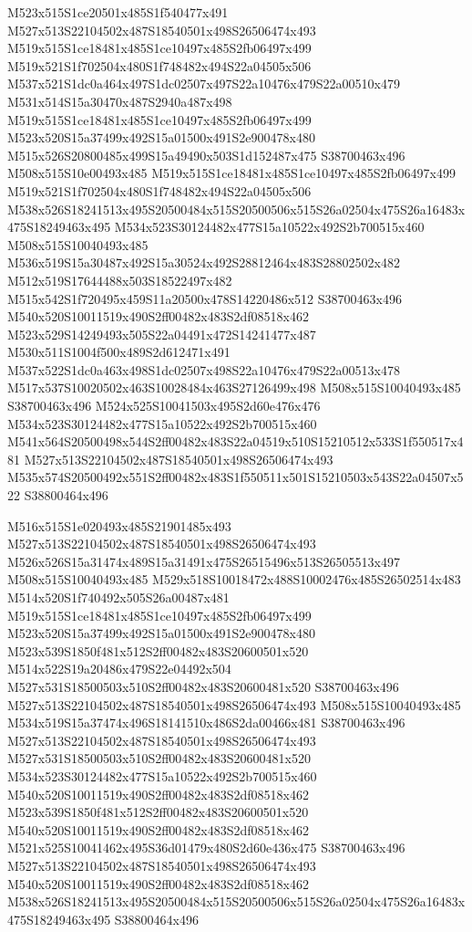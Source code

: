 \documentclass{article}
\begin{document}
\begin{multicols}{2}
M523x515S1ce20501x485S1f540477x491 M527x513S22104502x487S18540501x498S26506474x493 M519x515S1ce18481x485S1ce10497x485S2fb06497x499 M519x521S1f702504x480S1f748482x494S22a04505x506 M537x521S1dc0a464x497S1dc02507x497S22a10476x479S22a00510x479 M531x514S15a30470x487S2940a487x498 M519x515S1ce18481x485S1ce10497x485S2fb06497x499 M523x520S15a37499x492S15a01500x491S2e900478x480 M515x526S20800485x499S15a49490x503S1d152487x475 S38700463x496 M508x515S10e00493x485 M519x515S1ce18481x485S1ce10497x485S2fb06497x499 M519x521S1f702504x480S1f748482x494S22a04505x506 M538x526S18241513x495S20500484x515S20500506x515S26a02504x475S26a16483x475S18249463x495 M534x523S30124482x477S15a10522x492S2b700515x460 M508x515S10040493x485 M536x519S15a30487x492S15a30524x492S28812464x483S28802502x482 M512x519S17644488x503S18522497x482 M515x542S1f720495x459S11a20500x478S14220486x512 S38700463x496 M540x520S10011519x490S2ff00482x483S2df08518x462 M523x529S14249493x505S22a04491x472S14241477x487 M530x511S1004f500x489S2d612471x491 M537x522S1dc0a463x498S1dc02507x498S22a10476x479S22a00513x478 M517x537S10020502x463S10028484x463S27126499x498 M508x515S10040493x485 S38700463x496 M524x525S10041503x495S2d60e476x476 M534x523S30124482x477S15a10522x492S2b700515x460 M541x564S20500498x544S2ff00482x483S22a04519x510S15210512x533S1f550517x481 M527x513S22104502x487S18540501x498S26506474x493 M535x574S20500492x551S2ff00482x483S1f550511x501S15210503x543S22a04507x522 S38800464x496


M516x515S1e020493x485S21901485x493 M527x513S22104502x487S18540501x498S26506474x493 M526x526S15a31474x489S15a31491x475S26515496x513S26505513x497 M508x515S10040493x485 M529x518S10018472x488S10002476x485S26502514x483 M514x520S1f740492x505S26a00487x481 M519x515S1ce18481x485S1ce10497x485S2fb06497x499 M523x520S15a37499x492S15a01500x491S2e900478x480 M523x539S1850f481x512S2ff00482x483S20600501x520 M514x522S19a20486x479S22e04492x504 M527x531S18500503x510S2ff00482x483S20600481x520 S38700463x496 M527x513S22104502x487S18540501x498S26506474x493 M508x515S10040493x485 M534x519S15a37474x496S18141510x486S2da00466x481 S38700463x496 M527x513S22104502x487S18540501x498S26506474x493 M527x531S18500503x510S2ff00482x483S20600481x520 M534x523S30124482x477S15a10522x492S2b700515x460 M540x520S10011519x490S2ff00482x483S2df08518x462 M523x539S1850f481x512S2ff00482x483S20600501x520 M540x520S10011519x490S2ff00482x483S2df08518x462 M521x525S10041462x495S36d01479x480S2d60e436x475 S38700463x496 M527x513S22104502x487S18540501x498S26506474x493 M540x520S10011519x490S2ff00482x483S2df08518x462 M538x526S18241513x495S20500484x515S20500506x515S26a02504x475S26a16483x475S18249463x495 S38800464x496


\end{multicols}
\end{document}
